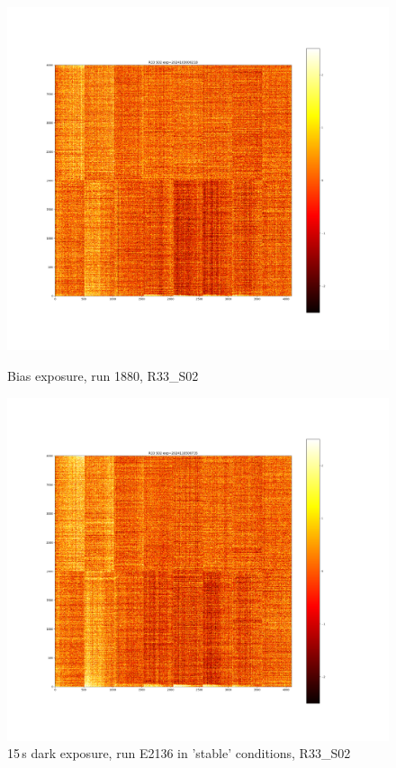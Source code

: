 \begin{figure}[htbp]
\centering
\begin{minipage}{0.45\textwidth}
    \centering
    \includegraphics[width=\textwidth]{figures/E1880_bias_R33_S02.png}
    \caption{Bias exposure, run 1880, R33\_S02}
    \label{fig:r33_s02_1880}
\end{minipage}
\hfill
\begin{minipage}{0.45\textwidth}
    \centering
    \includegraphics[width=\textwidth]{figures/E2136_dark15_R33_S02.png}
    \caption{15\,s dark exposure, run E2136 in 'stable' conditions, R33\_S02}
    \label{fig:r33_s02_2136}
\end{minipage}


\end{figure}
